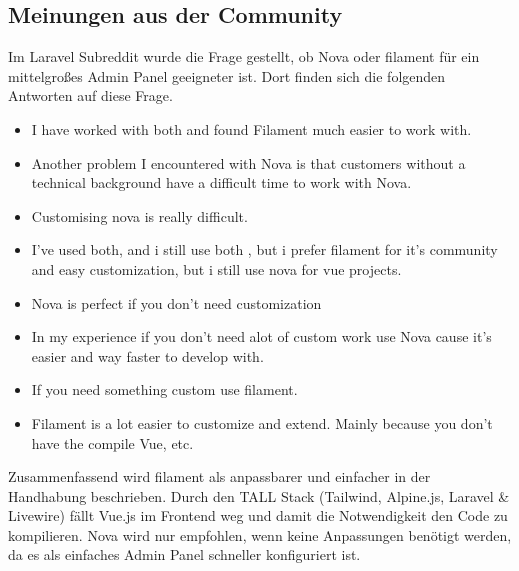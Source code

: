 \subsection{Meinungen aus der Community}
Im Laravel Subreddit wurde die Frage gestellt, ob Nova oder filament für ein mittelgroßes Admin Panel geeigneter ist\cite{reddit-laravel-nova-vs-filament}.
Dort finden sich die folgenden Antworten auf diese Frage.

\begin{itemize}
    \item I have worked with both and found Filament much easier to work with.
    \item Another problem I encountered with Nova is that customers without a technical background have a difficult time to work with Nova.
    \item Customising nova is really difficult.
    \item I've used both, and i still use both , but i prefer filament for it's community and easy customization, but i still use nova for vue projects.
    \item Nova is perfect if you don't need customization
    \item In my experience if you don’t need alot of custom work use Nova cause it’s easier and way faster to develop with.
    \item If you need something custom use filament.
    \item Filament is a lot easier to customize and extend. Mainly because you don’t have the compile Vue, etc.
\end{itemize}

Zusammenfassend wird filament als anpassbarer und einfacher in der Handhabung beschrieben.
Durch den TALL Stack (Tailwind, Alpine.js, Laravel \& Livewire) fällt Vue.js im Frontend weg und damit die Notwendigkeit den Code zu kompilieren.
Nova wird nur empfohlen, wenn keine Anpassungen benötigt werden, da es als einfaches Admin Panel schneller konfiguriert ist.
